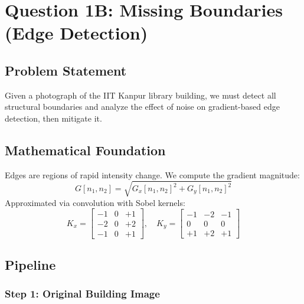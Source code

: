 \documentclass[12pt,a4paper]{article}
\begin{document}
\clearpage

\section{Question 1B: Missing Boundaries (Edge Detection)}

\subsection{Problem Statement}
Given a photograph of the IIT Kanpur library building, we must detect all structural boundaries and analyze the effect of noise on gradient-based edge detection, then mitigate it.

\subsection{Mathematical Foundation}

\begin{math_box}
Edges are regions of rapid intensity change. We compute the gradient magnitude:
\begin{equation}
    G[n_1, n_2] = \sqrt{G_x[n_1, n_2]^2 + G_y[n_1, n_2]^2}
\end{equation}
Approximated via convolution with Sobel kernels:
\begin{equation}
    K_x = \begin{bmatrix} -1 & 0 & +1 \\ -2 & 0 & +2 \\ -1 & 0 & +1 \end{bmatrix}, \quad
    K_y = \begin{bmatrix} -1 & -2 & -1 \\ 0 & 0 & 0 \\ +1 & +2 & +1 \end{bmatrix}
\end{equation}
\end{math_box}

\subsection{Pipeline}

\subsubsection{Step 1: Original Building Image}
\end{document}
